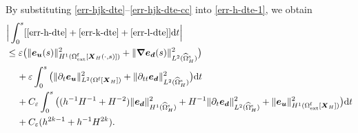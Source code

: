\documentclass[11pt,reqno]{amsart}
\theoremstyle{definition}
\theoremstyle{plain}
\numberwithin{theorem}{section}
\numberwithin{proposition}{section}
\numberwithin{lemma}{section}
\numberwithin{equation}{section}
\newcommand{\bs}[1]{\boldsymbol{#1}}
\newcommand{\uu}[1]  {{\bs{#1}} }
\newcommand{\dep}{{{\bs{d}}}}
\newcommand{\grad}   { \uu{\nabla}    }
\def\d{\mathrm{d}}
\renewcommand{\(}{\bigl(}
\renewcommand{\)}{\bigr)}
\begin{document}
By substituting \eqref{err-hjk-dte}--\eqref{err-hjk-dte-cc} into \eqref{err-h-dte-1}, we obtain 
\begin{align}
&\Big| \int_0^s  [\eqref{err-h-dte} + \eqref{err-k-dte} + \eqref{err-l-dte}] \d t \Big| \notag\\
&\le \varepsilon
\big( \|{\bs e}_{\bs u}(s)\|_{H^1(\Omega^{\rm f}_{\rm ext}[{\bs X}_H(\cdot,s)])}^2 + \|\grad{\bs e}_{\bs d}(s)\|_{L^2(\widehat\Omega^{\rm s}_H)}^2 \big) \notag\\
&\quad\, 
+ \varepsilon \int_0^s \big(  \|\partial_t{\bs e}_{\bs u}\|_{L^2(\Omega^{\rm f}[{\bs X}_H])}^2 
+ \|\partial_{tt} {\bs e}_\dep\|_{L^2(\widehat\Omega^{\rm s}_H)}^2 \big) \d t \notag\\
&\quad\, 
+ C_\varepsilon \int_0^s \big((h^{-1}H^{-1}+H^{-2}) \|{\bs e}_{\bs d}\|_{H^1(\widehat\Omega^{\rm s}_H)}^2  
+ H^{-1} \|\partial_t{\bs e}_{\bs d}\|_{L^2(\widehat\Omega^{\rm s}_H)}^2 + \|{\bs e}_{\bs u}\|_{H^1(\Omega^{\rm f}_{\rm ext}[{\bs X}_H])}^2  \big) \d t \notag\\
&\quad\, + C_\varepsilon (h^{2k-1} + h^{-1}H^{2k}) . 
\end{align}
\end{document}
